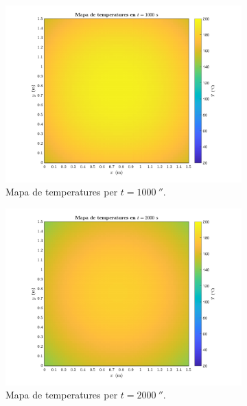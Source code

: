\begin{figure}[ht]
	\centering
	\begin{subfigure}{.5\textwidth}
		\centering
		\includegraphics[width=.95\linewidth]{imagenes/06_canvi_condicions_contorn/t_1000.pdf}
		\vspace{-10pt}
		\caption{Mapa de temperatures per $t = 1000 \ \second$.}
		\label{fig:nou_t_1000}
	\end{subfigure}%
	\begin{subfigure}{.5\textwidth}
		\centering
		\includegraphics[width=.95\linewidth]{imagenes/06_canvi_condicions_contorn/t_2000.pdf}
		\vspace{-10pt}
		\caption{Mapa de temperatures per $t = 2000 \ \second$.}
		\label{fig:nou_t_2000}
	\end{subfigure}
	\begin{subfigure}{.5\textwidth}

\end{subfigure}
\end{figure}
